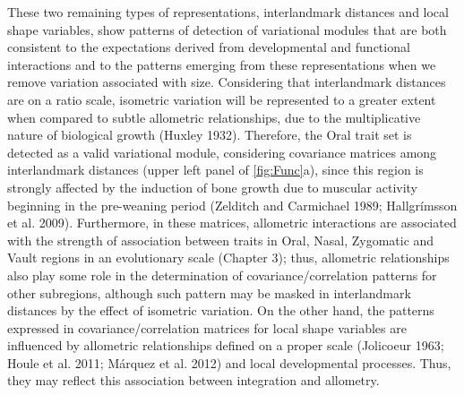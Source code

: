 \documentclass[12pt,]{article}
\begin{document}
These two remaining types of representations, interlandmark distances
and local shape variables, show patterns of detection of variational
modules that are both consistent to the expectations derived from
developmental and functional interactions and to the patterns emerging
from these representations when we remove variation associated with
size. Considering that interlandmark distances are on a ratio scale,
isometric variation will be represented to a greater extent when
compared to subtle allometric relationships, due to the multiplicative
nature of biological growth (Huxley 1932). Therefore, the Oral trait set
is detected as a valid variational module, considering covariance
matrices among interlandmark distances (upper left panel of
\autoref{fig:Func}a), since this region is strongly affected by the
induction of bone growth due to muscular activity beginning in the
pre-weaning period (Zelditch and Carmichael 1989; Hallgrímsson et al.
2009). Furthermore, in these matrices, allometric interactions are
associated with the strength of association between traits in Oral,
Nasal, Zygomatic and Vault regions in an evolutionary scale (Chapter 3);
thus, allometric relationships also play some role in the determination
of covariance/correlation patterns for other subregions, although such
pattern may be masked in interlandmark distances by the effect of
isometric variation. On the other hand, the patterns expressed in
covariance/correlation matrices for local shape variables are influenced
by allometric relationships defined on a proper scale (Jolicoeur 1963;
Houle et al. 2011; Márquez et al. 2012) and local developmental
processes. Thus, they may reflect this association between integration
and allometry.
\end{document}
